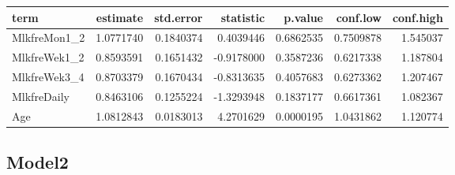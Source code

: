 \documentclass[
]{article}
\newenvironment{Shaded}{\begin{snugshade}}{\end{snugshade}}
\newcommand{\DataTypeTok}[1]{\textcolor[rgb]{0.13,0.29,0.53}{#1}}
\newcommand{\KeywordTok}[1]{\textcolor[rgb]{0.13,0.29,0.53}{\textbf{#1}}}
\newcommand{\NormalTok}[1]{#1}
\newcommand{\OperatorTok}[1]{\textcolor[rgb]{0.81,0.36,0.00}{\textbf{#1}}}
\newcommand{\OtherTok}[1]{\textcolor[rgb]{0.56,0.35,0.01}{#1}}
\newcommand{\StringTok}[1]{\textcolor[rgb]{0.31,0.60,0.02}{#1}}
\begin{document}
\begin{longtable}[]{@{}lrrrrrr@{}}
\toprule
term & estimate & std.error & statistic & p.value & conf.low &
conf.high\tabularnewline
\midrule
\endhead
MlkfreMon1\_2 & 1.0771740 & 0.1840374 & 0.4039446 & 0.6862535 &
0.7509878 & 1.545037\tabularnewline
MlkfreWek1\_2 & 0.8593591 & 0.1651432 & -0.9178000 & 0.3587236 &
0.6217338 & 1.187804\tabularnewline
MlkfreWek3\_4 & 0.8703379 & 0.1670434 & -0.8313635 & 0.4057683 &
0.6273362 & 1.207467\tabularnewline
MlkfreDaily & 0.8463106 & 0.1255224 & -1.3293948 & 0.1837177 & 0.6617361
& 1.082367\tabularnewline
Age & 1.0812843 & 0.0183013 & 4.2701629 & 0.0000195 & 1.0431862 &
1.120774\tabularnewline
\bottomrule
\end{longtable}

\hypertarget{model2-3}{%
\subsection{Model2}\label{model2-3}}

\begin{Shaded}
\end{Shaded}
\end{document}
